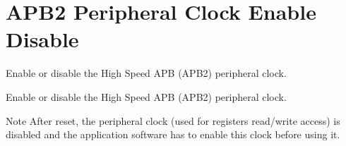 \hypertarget{group___r_c_c_ex___a_p_b2___clock___enable___disable}{}\section{A\+P\+B2 Peripheral Clock Enable Disable}
\label{group___r_c_c_ex___a_p_b2___clock___enable___disable}


Enable or disable the High Speed A\+PB (A\+P\+B2) peripheral clock.  


Enable or disable the High Speed A\+PB (A\+P\+B2) peripheral clock. 

\begin{DoxyNote}{Note}
After reset, the peripheral clock (used for registers read/write access) is disabled and the application software has to enable this clock before using it. 
\end{DoxyNote}
